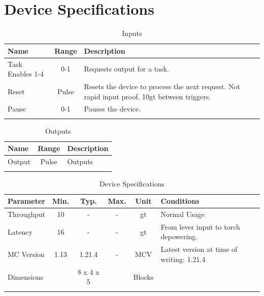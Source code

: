 \documentclass[10pt]{datasheet}
\begin{document}
\section{Device Specifications}

\begin{table}[H]
    \caption{Inputs}
    \begin{tabularx}{\textwidth}{l | c | X}
        \thickhline
        \textbf{Name} & \textbf{Range} & \textbf{Description} \\
        \hline
        Task Enables 1-4 & 0-1 & Requests output for a task. \\
        \hline
        Reset & Pulse & Resets the device to process the next request. Not rapid input proof. 10gt between triggers. \\
        \hline
        Pause & 0-1 & Pauses the device. \\
        \thickhline
\end{tabularx}
\end{table}

\begin{table}[H]
    \caption{Outputs}
    \begin{tabularx}{\textwidth}{l | c | X}
        \thickhline
        \textbf{Name} & \textbf{Range} & \textbf{Description} \\
        \hline
        Output & Pulse & Outputs \\
        \thickhline
\end{tabularx}
\end{table}

\begin{table}[H]
    \caption{Device Specifications}
    \begin{tabularx}{\textwidth}{l | c c c | c | X}
        \thickhline
        \textbf{Parameter} & \textbf{Min.} & \textbf{Typ.} & \textbf{Max.} &
        \textbf{Unit} & \textbf{Conditions} \\
        \hline
        Throughput  & 10 & - & - & gt & Normal Usage \\
        \hline
        Latency    & 16 & - & - & gt & From lever input to torch depowering. \\
        \hline
        MC Version & 1.13 & 1.21.4 & - & MCV & Latest version at time of writing: 1.21.4 \\
        \hline
        Dimensions & & 8 x 4 x 5 & & Blocks & \\
        \thickhline
\end{tabularx}
\end{table}
\end{document}
